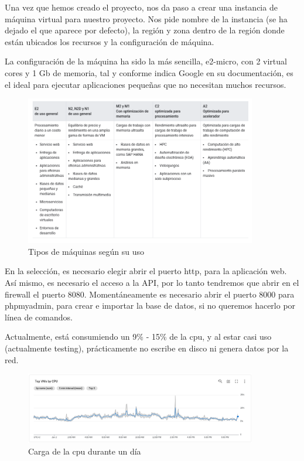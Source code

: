 \documentclass[11pt,spanish,listoffigures,listoftables]{tfgetsinf}
\begin{document}
Una vez que hemos creado el proyecto, nos da paso a crear una instancia de máquina virtual para nuestro proyecto. 
Nos pide nombre de la instancia (se ha dejado el que aparece por defecto), la región y zona dentro de la región donde están ubicados los recursos y la configuración de máquina.

La configuración de la máquina ha sido la más sencilla, e2-micro, con 2 virtual cores y 1 Gb de memoria, tal y conforme indica Google en su documentación, es el ideal para ejecutar aplicaciones pequeñas que no necesitan muchos recursos.

\begin{figure}[h!] %
  \centering
   \includegraphics[width=0.90\textwidth]{img/cargas de trabajo.png}
   \caption{Tipos de máquinas según su uso}
   \label{fig:cargas}
 \end{figure}

 En la selección, es necesario elegir abrir el puerto http, para la aplicación web. Así mismo, es necesario el acceso a la API, por lo tanto tendremos que abrir en el firewall el puerto 8080. 
 Momentáneamente es necesario abrir el puerto 8000 para phpmyadmin, para crear e importar la base de datos, si no queremos hacerlo por línea de comandos.

 Actualmente, está consumiendo un 9\% - 15\% de la cpu, y al estar casi uso (actualmente testing), prácticamente no escribe en disco ni genera datos por la red.

 \begin{figure}[H] %
  \centering
   \includegraphics[width=0.90\textwidth]{img/usocpu.png}
   \caption{Carga de la cpu durante un día}
   \label{fig:cargaweb}
 \end{figure}
\end{document}
